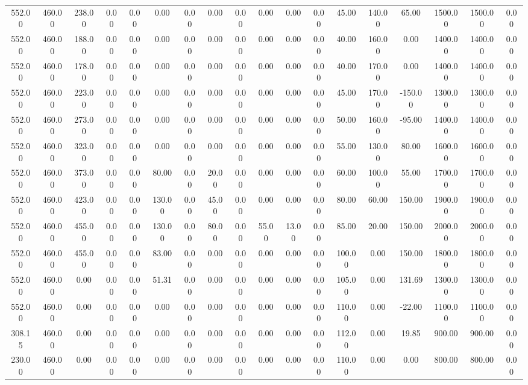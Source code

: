 \begin{table}[!ht]
{\begin{tabular}{cccccccccccccccccc}
552.00 & 460.00 & 238.00 & 0.00 & 0.00 & 0.00 & 0.00 & 0.00 & 0.00 & 0.00 & 0.00 & 0.00 & 45.00 & 140.00 & 65.00 & 1500.00 & 1500.00 & 0.00 \\
552.00 & 460.00 & 188.00 & 0.00 & 0.00 & 0.00 & 0.00 & 0.00 & 0.00 & 0.00 & 0.00 & 0.00 & 40.00 & 160.00 & 0.00 & 1400.00 & 1400.00 & 0.00 \\
552.00 & 460.00 & 178.00 & 0.00 & 0.00 & 0.00 & 0.00 & 0.00 & 0.00 & 0.00 & 0.00 & 0.00 & 40.00 & 170.00 & 0.00 & 1400.00 & 1400.00 & 0.00 \\
552.00 & 460.00 & 223.00 & 0.00 & 0.00 & 0.00 & 0.00 & 0.00 & 0.00 & 0.00 & 0.00 & 0.00 & 45.00 & 170.00 & -150.00 & 1300.00 & 1300.00 & 0.00 \\
552.00 & 460.00 & 273.00 & 0.00 & 0.00 & 0.00 & 0.00 & 0.00 & 0.00 & 0.00 & 0.00 & 0.00 & 50.00 & 160.00 & -95.00 & 1400.00 & 1400.00 & 0.00 \\
552.00 & 460.00 & 323.00 & 0.00 & 0.00 & 0.00 & 0.00 & 0.00 & 0.00 & 0.00 & 0.00 & 0.00 & 55.00 & 130.00 & 80.00 & 1600.00 & 1600.00 & 0.00 \\
552.00 & 460.00 & 373.00 & 0.00 & 0.00 & 80.00 & 0.00 & 20.00 & 0.00 & 0.00 & 0.00 & 0.00 & 60.00 & 100.00 & 55.00 & 1700.00 & 1700.00 & 0.00 \\
552.00 & 460.00 & 423.00 & 0.00 & 0.00 & 130.00 & 0.00 & 45.00 & 0.00 & 0.00 & 0.00 & 0.00 & 80.00 & 60.00 & 150.00 & 1900.00 & 1900.00 & 0.00 \\
552.00 & 460.00 & 455.00 & 0.00 & 0.00 & 130.00 & 0.00 & 80.00 & 0.00 & 55.00 & 13.00 & 0.00 & 85.00 & 20.00 & 150.00 & 2000.00 & 2000.00 & 0.00 \\
552.00 & 460.00 & 455.00 & 0.00 & 0.00 & 83.00 & 0.00 & 0.00 & 0.00 & 0.00 & 0.00 & 0.00 & 100.00 & 0.00 & 150.00 & 1800.00 & 1800.00 & 0.00 \\
552.00 & 460.00 & 0.00 & 0.00 & 0.00 & 51.31 & 0.00 & 0.00 & 0.00 & 0.00 & 0.00 & 0.00 & 105.00 & 0.00 & 131.69 & 1300.00 & 1300.00 & 0.00 \\
552.00 & 460.00 & 0.00 & 0.00 & 0.00 & 0.00 & 0.00 & 0.00 & 0.00 & 0.00 & 0.00 & 0.00 & 110.00 & 0.00 & -22.00 & 1100.00 & 1100.00 & 0.00 \\
308.15 & 460.00 & 0.00 & 0.00 & 0.00 & 0.00 & 0.00 & 0.00 & 0.00 & 0.00 & 0.00 & 0.00 & 112.00 & 0.00 & 19.85 & 900.00 & 900.00 & 0.00 \\
230.00 & 460.00 & 0.00 & 0.00 & 0.00 & 0.00 & 0.00 & 0.00 & 0.00 & 0.00 & 0.00 & 0.00 & 110.00 & 0.00 & 0.00 & 800.00 & 800.00 & 0.00 \\
\bottomrule
\end{tabular}
}
\end{table}